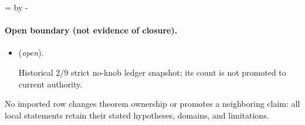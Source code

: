 \documentclass[11pt]{article}
\begin{document}
\par\begingroup{}=\pagegoal\advance{} by -\pagetotal\ifdim\dimen0<7\baselineskip\newpage\fi\endgroup
\paragraph{Open boundary (not evidence of closure).}
\begin{itemize}
\setlength{\itemsep}{0.25em}
\item {} (\emph{open}).\par Historical 2/9
strict no-knob ledger snapshot; its count is not promoted to current authority.
\end{itemize}

No imported row changes theorem ownership or promotes a neighboring claim: all local statements retain their stated hypotheses, domains, and limitations.
\end{document}
